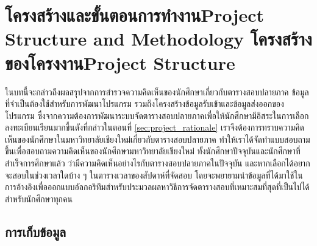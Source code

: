 \chapter{\ifproject%
\ifcpe โครงสร้างและขั้นตอนการทำงาน\else Project Structure and Methodology\fi
\else%
\ifcpe โครงสร้างของโครงงาน\else Project Structure\fi
\fi
}


\makeatletter


\makeatother
ในบทนี้จะกล่าวถึงผลสรุปจากการสํารวจความคิดเห็นของนักศึกษาเกี่ยวกับตารางสอบปลายภาค ข้อมูลที่จำเป็นต้องใช้สำหรับการพัฒนาโปรแกรม รวมถึงโครงสร้างข้อมูลรับเข้าและข้อมูลส่งออกของโปรแกรม
ซึ่งจากความต้องการพัฒนาระบบจัดตารางสอบปลายภาคเพื่อให้นักศึกษามีอิสระในการเลือกลงทะเบียนเรียนมากขึ้นดังที่กล่าวในตอนที่ \ref{sec:project_rationale} เราจึงต้องการทราบความคิดเห็นของนักศึกษาในมหาวิทยาลัยเชียงใหม่เกี่ยวกับตารางสอบปลายภาค 
ทำให้เราได้จัดทำแบบสอบถามขึ้นเพื่อสอบถามความคิดเห็นของนักศึกษามหาวิทยาลัยเชียงใหม่ ทั้งนักศึกษาปัจจุบันและนักศึกษาที่สำเร็จการศึกษาแล้ว ว่ามีความคิดเห็นอย่างไรกับตารางสอบปลายภาคในปัจจุบัน และหากเลือกได้อยากจะสอบในช่วงเวลาใดบ้าง ๆ ในตารางเวลาของสัปดาห์ที่จัดสอบ 
โดยจะพยายามนำข้อมูลที่ได้มาใช้ในการอ้างอิงเพื่อออกแบบอัลกอริทึมสำหรับประมวลผลหาวิธีการจัดตารางสอบที่เหมาะสมที่สุดที่เป็นไปได้สำหรับนักศึกษาทุกคน

\section{การเก็บข้อมูล}
